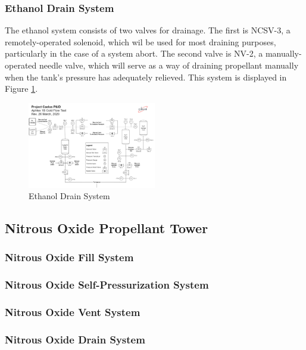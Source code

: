 \documentclass[9pt]{article} %
\numberwithin{equation}{section} %
\begin{document}
\subsubsection{Ethanol Drain System}
\hspace{\parindent} The ethanol system consists of two valves for drainage. The first is NCSV-3, a remotely-operated solenoid, which wil be used for most draining purposes, particularly in the case of a system abort. The second valve is NV-2, a manually-operated needle valve, which will serve as a way of draining propellant manually when the tank's pressure has adequately relieved. This system is displayed in Figure \ref{fig:ethanol_drain_system}.

\begin{figure}[!htb] 
    \centering
    \includegraphics[scale=0.5, width=0.5\textwidth, trim={7cm 7cm 28cm 19.2cm}, clip]{pid} %
    \caption{Ethanol Drain System}
    \label{fig:ethanol_drain_system}
\end{figure}

\subsection{Nitrous Oxide Propellant Tower}
\subsubsection{Nitrous Oxide Fill System}
\subsubsection{Nitrous Oxide Self-Pressurization System}
\subsubsection{Nitrous Oxide Vent System}
\subsubsection{Nitrous Oxide Drain System}
\end{document}
